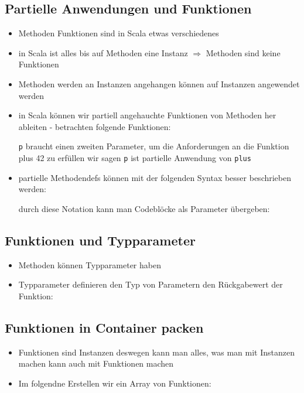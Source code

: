 \subsection{Partielle Anwendungen und Funktionen}
\begin{itemize}
  \item Methoden \und Funktionen sind in Scala etwas verschiedenes
  \item in Scala ist alles bis auf Methoden eine Instanz $\Rightarrow$ 
  Methoden sind keine Funktionen
  \item Methoden werden an Instanzen angehangen \und können auf
  Instanzen angewendet werden
  \item in Scala können wir partiell angehauchte Funktionen von Methoden her ableiten - betrachten folgende Funktionen:
  
  
  
  \texttt{p} braucht einen zweiten Parameter, um die Anforderungen an
  die Funktion plus 42 zu erfüllen \und wir sagen \texttt{p} ist
  partielle Anwendung von \texttt{plus}
  
  \item partielle Methodendefs können mit der folgenden Syntax besser
  beschrieben werden:
  
  
  
  
  durch diese Notation kann man Codeblöcke als Parameter übergeben:
  
  
\end{itemize}


\subsection{Funktionen und Typparameter}
\begin{itemize}
  \item Methoden können Typparameter haben 
  \item Typparameter definieren den Typ von Parametern \oder den 
  Rückgabewert der Funktion:
  
  
\end{itemize}


\subsection{Funktionen in Container packen}
\begin{itemize}
  \item Funktionen sind Instanzen \und deswegen kann man alles, was man
  mit Instanzen machen kann auch mit Funktionen machen
  \item Im folgendne Erstellen wir ein Array von Funktionen:
  
    
\end{itemize}


